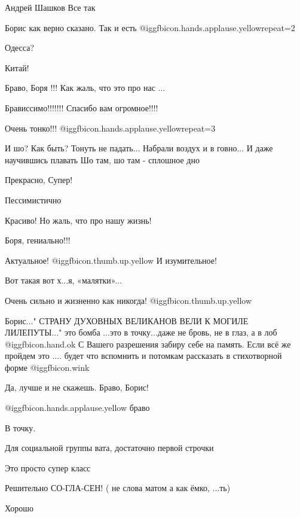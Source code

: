 \begin{itemize}
Андрей Шашков
Все так

Борис как верно сказано. Так и есть  @igg{fbicon.hands.applause.yellow}{repeat=2} 

Одесса?

Китай!

Браво, Боря !!!
Как жаль, что это про нас ...

Брависсимо!!!!!!!
Спасибо вам огромное!!!!

Очень тонко!!!  @igg{fbicon.hands.applause.yellow}{repeat=3} 


\obeycr
И шо? Как быть?
Тонуть не падать...
Набрали воздух и в говно...
И даже научившись плавать
Шо там, шо там - сплошное дно
\restorecr

Прекрасно, Супер!

Пессимистично

Красиво! Но жаль, что про нашу жизнь!

Боря, гениально!!!

Актуальное!  @igg{fbicon.thumb.up.yellow} И изумительное!

Вот такая вот х...я, «малятки»...

Очень сильно и жизненно как никогда! @igg{fbicon.thumb.up.yellow} 

Борис..." СТРАНУ ДУХОВНЫХ ВЕЛИКАНОВ
ВЕЛИ К МОГИЛЕ ЛИЛЕПУТЫ..." это бомба
...это в точку...даже не бровь, не в глаз, а в лоб @igg{fbicon.hand.ok} 
С Вашего разрешения забиру себе на память. Если всё же пройдем это .... будет что вспомнить и потомкам рассказать в стихотворной форме @igg{fbicon.wink} 

Да, лучше и не скажешь. Браво, Борис!

 @igg{fbicon.hands.applause.yellow}  браво

В точку.

Для социальной группы вата, достаточно первой строчки

Это просто супер класс

Решительно СО-ГЛА-СЕН!
( не слова матом а как ёмко, ...ть)

Хорошо


\end{itemize}
